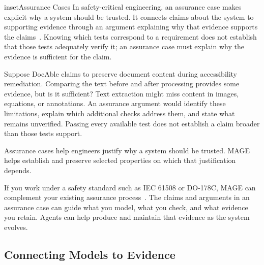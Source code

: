 



\begin{bookbox}{inset}{Assurance Cases}
\label{inset-assurance-cases}
In safety-critical engineering, an assurance case makes explicit why a system should be trusted. It connects claims about the system to supporting evidence through an argument explaining why that evidence supports the claims~\citep{iso15026-2-2022,kelly2004gsn}. Knowing which tests correspond to a requirement does not establish that those tests adequately verify it; an assurance case must explain why the evidence is sufficient for the claim.

Suppose DocAble claims to preserve document content during accessibility remediation. Comparing the text before and after processing provides some evidence, but is it sufficient? Text extraction might miss content in images, equations, or annotations. An assurance argument would identify these limitations, explain which additional checks address them, and state what remains unverified. Passing every available test does not establish a claim broader than those tests support.

Assurance cases help engineers justify why a system should be trusted. MAGE helps establish and preserve selected properties on which that justification depends.

If you work under a safety standard such as IEC 61508 or DO-178C, MAGE can complement your existing assurance process~\citep{iec61508-1-2010,rtca-do178c-2011}. The claims and arguments in an assurance case can guide what you model, what you check, and what evidence you retain. Agents can help produce and maintain that evidence as the system evolves.
\end{bookbox}

\subsection{Connecting Models to Evidence}\label{heading:connecting-models-to-evidence}



